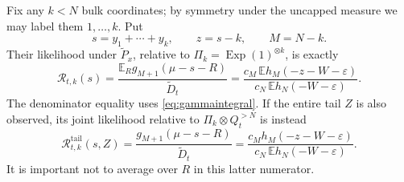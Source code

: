 \documentclass[11pt,letterpaper]{article}
\numberwithin{equation}{section}
\theoremstyle{definition}
\theoremstyle{remark}
\newcommand{\EE}{\mathbb E}
\newcommand{\Exp}{\operatorname{Exp}}
\newcommand{\eps}{\varepsilon}
\begin{document}
Fix any $k<N$ bulk coordinates; by symmetry under the uncapped measure we
may label them $1,\ldots,k$. Put
\[
 s=y_1+\cdots+y_k,\qquad z=s-k,\qquad M=N-k.
\]
Their likelihood under $\widetilde P_x$, relative to
$\Pi_k=\Exp(1)^{\otimes k}$, is exactly
\begin{equation}
 \mathcal R_{t,k}(s)
 =\frac{\EE_R g_{M+1}(\mu-s-R)}{\widetilde D_t}
 =\frac{c_M\,\EE h_M(-z-W-\eps)}
        {c_N\,\EE h_N(-W-\eps)}.
 \label{eq:exactlikelihood}
\end{equation}
The denominator equality uses \eqref{eq:gammaintegral}. If the entire tail
$Z$ is also observed, its joint likelihood relative to
$\Pi_k\otimes Q_t^{>N}$ is instead
\begin{equation}
 \mathcal R^{\mathrm{tail}}_{t,k}(s,Z)
 =\frac{g_{M+1}(\mu-s-R)}{\widetilde D_t}
 =\frac{c_M h_M(-z-W-\eps)}
        {c_N\,\EE h_N(-W-\eps)}.
 \label{eq:taillikelihood}
\end{equation}
It is important not to average over $R$ in this latter numerator.
\end{document}
